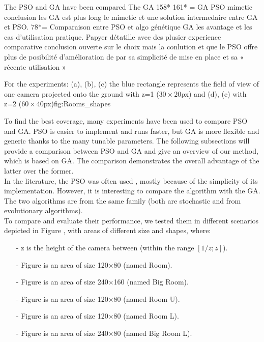 The PSO and GA have been compared 
The GA 
158* 161* = GA PSO mimetic  conclusion les GA est plus long  le mimetic et  une solution intermedaire entre GA et PSO.
78*= Comparaison entre PSO et algo génétique GA  les avantage  et les cas d’utilisation pratique.
Papyer détatille  avec des plusier experience comparative  conclusion ouverte sur le choix mais la conlution et que le PSO offre plus de posibilité d’amélioration de par sa simplicité de mise en place et sa « récente utilisation » 


\begin{mfigures}[!]{For the experiments: (a), (b), (c) the blue rectangle represents the field of view of one camera projected onto the ground  with z=1 ($30 \times 20 $px) and (d), (e) with z=2 ($60 \times 40 $px)}{fig:Rooms_shapes} \centering
{}
\hspace{1cm}
\hspace{1cm}
\end{mfigures}

To find the best coverage, many experiments have been used to compare PSO and GA. PSO is easier to implement and runs faster, but GA is more flexible and generic thanks to the many tunable parameters. 
The following subsections will provide a comparison between PSO and GA and give an overview of our method, which is based on GA. The comparison demonstrates the overall advantage of the latter over the former.\\
In the literature, the PSO was often used \cite{8*zhou2011,33*reddy2012}, mostly because of the simplicity of its implementation. However, it is interesting to compare the algorithm with the GA. The two algorithms are from the same family (both are stochastic and from evolutionary algorithms).\\
To compare and evaluate their performance, we tested them in different scenarios depicted in Figure , with areas of different size and shapes, where: 




\begin{itemize}
\item[-]    z is the height of the camera between (within the range $[1/z;z]$).
\item[-]	Figure  is an area of size 120$\times$80 (named Room). 
\item[-]	Figure  is an area of size 240$\times$160 (named Big Room).
\item[-]	Figure  is an area of size 120$\times$80 (named Room U).
\item[-]	Figure  is an area of size 120$\times$80 (named Room L).
\item[-]	Figure  is an area of size 240$\times$80 (named Big Room L).
\end{itemize}


